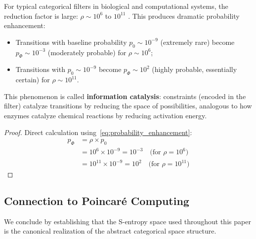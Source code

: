 \begin{corollary}
\label{cor:information_catalysis_formal}
For typical categorical filters in biological and computational systems, the reduction factor is large: $\rho \sim 10^6$ to $10^{11}$ \citep{mizraji2021biological}. This produces dramatic probability enhancement:
\begin{itemize}
    \item Transitions with baseline probability $p_0 \sim 10^{-9}$ (extremely rare) become $p_{\Phi} \sim 10^{-3}$ (moderately probable) for $\rho \sim 10^6$;
    \item Transitions with $p_0 \sim 10^{-9}$ become $p_{\Phi} \sim 10^{2}$ (highly probable, essentially certain) for $\rho \sim 10^{11}$.
\end{itemize}

This phenomenon is called \textbf{information catalysis}: constraints (encoded in the filter) catalyze transitions by reducing the space of possibilities, analogous to how enzymes catalyze chemical reactions by reducing activation energy.
\end{corollary}

\begin{proof}
Direct calculation using~\eqref{eq:probability_enhancement}:
\begin{align}
p_{\Phi} &= \rho \times p_0 \\
&= 10^6 \times 10^{-9} = 10^{-3} \quad \text{(for } \rho = 10^6\text{)} \\
&= 10^{11} \times 10^{-9} = 10^{2} \quad \text{(for } \rho = 10^{11}\text{)}
\end{align}
\end{proof}

\subsection{Connection to Poincaré Computing}

We conclude by establishing that the S-entropy space used throughout this paper is the canonical realization of the abstract categorical space structure.

